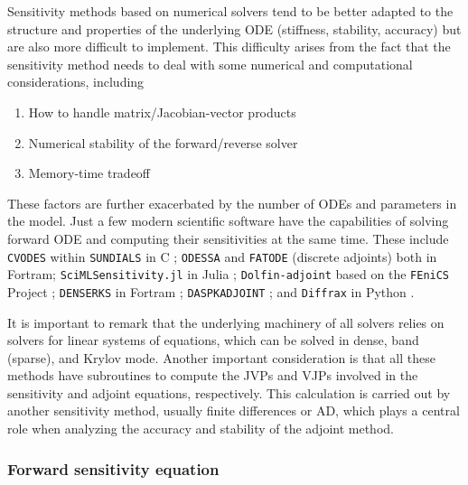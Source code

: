 
Sensitivity methods based on numerical solvers tend to be better adapted to the structure and properties of the underlying ODE (stiffness, stability, accuracy) but are also more difficult to implement.  
This difficulty arises from the fact that the sensitivity method needs to deal with some numerical and computational considerations, including
\begin{enumerate}[label=(\roman*)]
    \item How to handle matrix/Jacobian-vector products
    \item Numerical stability of the forward/reverse solver
    \item Memory-time tradeoff
\end{enumerate}
These factors are further exacerbated by the number of ODEs and parameters in the model. 
Just a few modern scientific software have the capabilities of solving forward ODE and computing their sensitivities at the same time. 
These include 
\texttt{CVODES} within \texttt{SUNDIALS} in C \cite{serban2005cvodes, SUNDIALS-hindmarsh2005sundials}; 
\texttt{ODESSA} \cite{ODESSA} and \texttt{FATODE} (discrete adjoints) \cite{FATODE2014} both in Fortram; 
\texttt{SciMLSensitivity.jl} in Julia \cite{rackauckas2020universal}; 
\texttt{Dolfin-adjoint} based on the \texttt{FEniCS} Project \cite{dolfin2013, dolfin2018};
\texttt{DENSERKS} in Fortram \cite{alexe2007denserks}; 
\texttt{DASPKADJOINT} \cite{Cao_Li_Petzold_2002};
and \texttt{Diffrax} in Python \cite{kidger2021on}. 

It is important to remark that the underlying machinery of all solvers relies on solvers for linear systems of equations, which can be solved in dense, band (sparse), and Krylov mode. 
Another important consideration is that all these methods have subroutines to compute the JVPs and VJPs involved in the sensitivity and adjoint equations, respectively. 
This calculation is carried out by another sensitivity method, usually finite differences or AD, which plays a central role when analyzing the accuracy and stability of the adjoint method. 

\subsubsection{Forward sensitivity equation}
\label{section:computing-sensitivity-equations}

